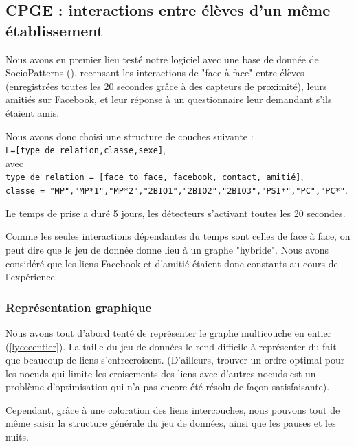 \documentclass[11pt,a4paper]{article}
\theoremstyle{definition}
\theoremstyle{remark}
\theoremstyle{remark}
\begin{document}
\subsection{CPGE : interactions entre élèves d'un même établissement}

    Nous avons en premier lieu testé notre logiciel avec une base de donnée de SocioPatterns (\cite{cpge}), recensant les interactions de "face à face" entre élèves (enregistrées toutes les 20 secondes grâce à des capteurs de proximité), leurs amitiés sur Facebook, et leur réponse à un questionnaire leur demandant s'ils étaient amis.

    Nous avons donc choisi une structure de couches suivante : \\
    {\tt L=[type de relation,classe,sexe]},\\
    avec\\
    {\tt type de relation = [face to face, facebook, contact, amitié]},\\
    {\tt classe = "MP","MP*1","MP*2","2BIO1","2BIO2","2BIO3","PSI*","PC","PC*"}.
  
    Le temps de prise a duré 5 jours, les détecteurs s'activant toutes les 20 secondes.
    
    Comme les seules interactions dépendantes du temps sont celles de face à face, on peut dire que le jeu de donnée donne lieu à un graphe "hybride". Nous avons considéré que les liens Facebook et d'amitié étaient donc constants au cours de l'expérience.
  
	\subsubsection{Représentation graphique}  
  
  Nous avons tout d'abord tenté de représenter le graphe multicouche en entier (\cref{lyceeentier}). La taille du jeu de données le rend difficile à représenter du fait que beaucoup de liens s'entrecroisent. (D'ailleurs, trouver un ordre optimal pour les noeuds qui limite les croisements des liens avec d'autres noeuds est un problème d'optimisation qui n'a pas encore été résolu de façon satisfaisante).
  
  Cependant, grâce à une coloration des liens intercouches, nous pouvons tout de même saisir la structure générale du jeu de données, ainsi que les pauses et les nuits.
	
\end{document}
